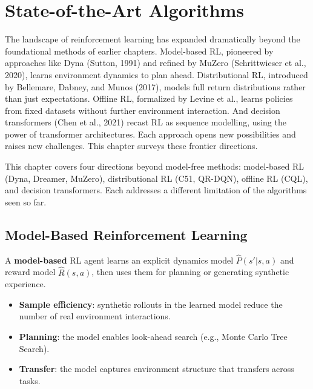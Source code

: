 \chapter{State-of-the-Art Algorithms}
\label{ch:sota}

The landscape of reinforcement learning has expanded dramatically beyond the foundational methods of earlier chapters. Model-based RL, pioneered by approaches like Dyna (Sutton, 1991) and refined by MuZero (Schrittwieser et al., 2020), learns environment dynamics to plan ahead. Distributional RL, introduced by Bellemare, Dabney, and Munos (2017), models full return distributions rather than just expectations. Offline RL, formalized by Levine et al., learns policies from fixed datasets without further environment interaction. And decision transformers (Chen et al., 2021) recast RL as sequence modelling, using the power of transformer architectures. Each approach opens new possibilities and raises new challenges. This chapter surveys these frontier directions.

\begin{intuition}
This chapter covers four directions beyond model-free methods:
model-based RL (Dyna, Dreamer, MuZero), distributional RL (C51, QR-DQN),
offline RL (CQL), and decision transformers. Each addresses a different
limitation of the algorithms seen so far.
\end{intuition}

\section{Model-Based Reinforcement Learning}
\label{sec:mbrl}

\begin{definition}
A \textbf{model-based} RL agent learns an explicit dynamics model
$\hat{P}(s'|s,a)$ and reward model $\hat{R}(s,a)$, then uses them
for planning or generating synthetic experience.
\end{definition}

\begin{proposition}
\begin{itemize}
    \item \textbf{Sample efficiency}: synthetic rollouts in the learned
    model reduce the number of real environment interactions.
    \item \textbf{Planning}: the model enables look-ahead search
    (e.g., Monte Carlo Tree Search).
    \item \textbf{Transfer}: the model captures environment structure
    that transfers across tasks.
\end{itemize}
\end{proposition}

